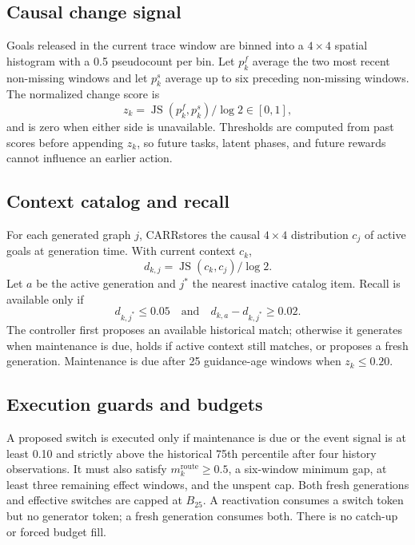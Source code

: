 \documentclass[sigconf,anonymous,review]{acmart}
\newcommand{\carr}{\textsc{CARR}}
\begin{document}
\subsection{Causal change signal}

Goals released in the current trace window are binned into a $4\times4$
spatial histogram with a 0.5 pseudocount per bin. Let $p_k^f$ average the two
most recent non-missing windows and let $p_k^s$ average up to six preceding
non-missing windows. The normalized change score is
\begin{equation}
 z_k=\operatorname{JS}(p_k^f,p_k^s)/\log 2\in[0,1],
\end{equation}
and is zero when either side is unavailable. Thresholds are computed from
past scores before appending $z_k$, so future tasks, latent phases, and future
rewards cannot influence an earlier action.

\subsection{Context catalog and recall}

For each generated graph $j$, \carr stores the causal $4\times4$ distribution
$c_j$ of active goals at generation time. With current context $c_k$,
\begin{equation}
 d_{k,j}=\operatorname{JS}(c_k,c_j)/\log 2.
\end{equation}
Let $a$ be the active generation and $j^*$ the nearest inactive catalog item.
Recall is available only if
\begin{equation}
 d_{k,j^*}\leq0.05
 \quad\text{and}\quad
 d_{k,a}-d_{k,j^*}\geq0.02.
\end{equation}
The controller first proposes an available historical match; otherwise it
generates when maintenance is due, holds if active context still matches, or
proposes a fresh generation. Maintenance is due after 25 guidance-age windows
when $z_k\leq0.20$.

\subsection{Execution guards and budgets}

A proposed switch is executed only if maintenance is due or the event signal
is at least 0.10 and strictly above the historical 75th percentile after four
history observations. It must also satisfy
$m_k^{\mathrm{route}}\geq0.5$, a six-window minimum gap, at least three
remaining effect windows, and the unspent cap. Both fresh generations and
effective switches are capped at $B_{25}$. A reactivation consumes a switch
token but no generator token; a fresh generation consumes both. There is no
catch-up or forced budget fill.
\end{document}
